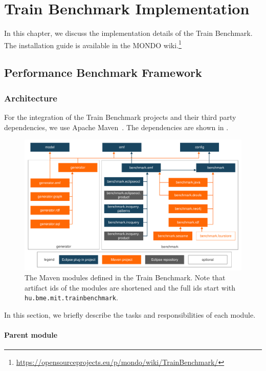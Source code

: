 \chapter{Train Benchmark Implementation}

In this chapter, we discuss the implementation details of the Train Benchmark. The installation guide is available in the MONDO wiki.\footnote{\url{https://opensourceprojects.eu/p/mondo/wiki/TrainBenchmark/}}

\section{Performance Benchmark Framework}

\subsection{Architecture}

For the integration of the Train Benchmark projects and their third party dependencies, we use Apache Maven~\cite{Maven}. The dependencies are shown in .

\begin{figure}[!Htb]
	\centering
	\includegraphics[width=\textwidth]{figures/trainbenchmark-modules}
	\caption{The Maven modules defined in the Train Benchmark. Note that artifact ids of the modules are shortened and the full ids start with \texttt{hu.bme.mit.trainbenchmark}.}
	\label{fig:trainbenchmark-modules}
\end{figure}

In this section, we briefly describe the tasks and responsibilities of each module.

\subsubsection{Parent module}

